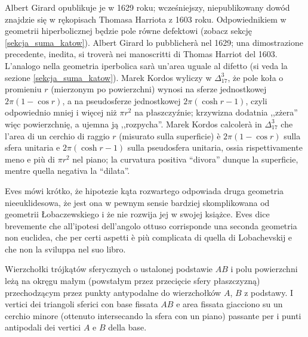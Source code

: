 Albert Girard opublikuje je w 1629 roku; wcześniejszy, niepublikowany dowód znajdzie się w rękopisach Thomasa Harriota z 1603 roku. %
Odpowiednikiem w geometrii hiperbolicznej będzie pole równe defektowi (zobacz sekcję \ref{sekcja_suma_katow}). %
Albert Girard lo pubblicherà nel 1629; una dimostrazione precedente, inedita, si troverà nei manoscritti di Thomas Harriot del 1603. %
L'analogo nella geometria iperbolica sarà un'area uguale al difetto (si veda la sezione \ref{sekcja_suma_katow}). %
Marek Kordos wyliczy w $\Delta_{17}^{3}$, że pole koła o promieniu $r$ (mierzonym po powierzchni) wynosi na sferze jednostkowej $2\pi(1 - \cos r)$, a na pseudosferze jednostkowej $2\pi(\cosh r - 1)$, czyli odpowiednio mniej i więcej niż $\pi r^2$ na płaszczyźnie; krzywizna dodatnia ,,zżera'' więc powierzchnię, a ujemna ją ,,rozpycha''. %
Marek Kordos calcolerà in $\Delta_{17}^{3}$ che l'area di un cerchio di raggio $r$ (misurato sulla superficie) è $2\pi(1 - \cos r)$ sulla sfera unitaria e $2\pi(\cosh r - 1)$ sulla pseudosfera unitaria, ossia rispettivamente meno e più di $\pi r^2$ nel piano; la curvatura positiva ``divora'' dunque la superficie, mentre quella negativa la ``dilata''. %
%
%

Eves \cite[s. 314--315]{eves1_1972} mówi krótko, że hipotezie kąta rozwartego odpowiada druga geometria nieeuklidesowa, że jest ona w pewnym sensie bardziej skomplikowana od geometrii Łobaczewskiego i że nie rozwija jej w swojej książce. %
Eves \cite[p. 314--315]{eves1_1972} dice brevemente che all'ipotesi dell'angolo ottuso corrisponde una seconda geometria non euclidea, che per certi aspetti è più complicata di quella di Lobachevskij e che non la sviluppa nel suo libro. %

\begin{proposition}
[twierdzenie Lexella] %
[teorema di Lexell] %
	Wierzchołki trójkątów sferycznych o ustalonej podstawie $AB$ i polu powierzchni leżą na okręgu małym (powstałym przez przecięcie sfery płaszczyzną) przechodzącym przez punkty antypodalne do wierzchołków $A$, $B$ z podstawy. %
	I vertici dei triangoli sferici con base fissata $AB$ e area fissata giacciono su un cerchio minore (ottenuto intersecando la sfera con un piano) passante per i punti antipodali dei vertici $A$ e $B$ della base. %
\end{proposition}

